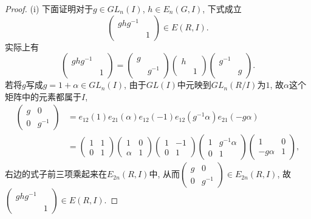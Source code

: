 \begin{proof}
	(i) 下面证明对于$g\in GL_n(I)$, $h\in E_n(G,I)$, 下式成立
	\[ \begin{pmatrix}
		ghg^{-1} & \\
			& 1
	\end{pmatrix} \in E(R,I).\]
	实际上有
	\[\begin{pmatrix}
		ghg^{-1} & \\
			& 1
	\end{pmatrix} = \begin{pmatrix}
		g & \\
			& g^{-1}
	\end{pmatrix}\begin{pmatrix}
		h & \\
			& 1
	\end{pmatrix}\begin{pmatrix}
		g^{-1} & \\
			& g
	\end{pmatrix}.\]
	若将$g$写成$g=1+\alpha \in GL_n(I)$, 由于$GL(I)$中元映到$GL_n(R/I)$为$1$, 故$\alpha$这个矩阵中的元素都属于$I$,
	\begin{align*}
	    \begin{pmatrix}
      g & 0 \\
      0 & g^{-1} 
    \end{pmatrix}
 &=e_{12}(1)e_{21}(\alpha)e_{12}(-1)e_{12}(g^{-1}\alpha)e_{21}(-g\alpha)\\
 &=\begin{pmatrix}
      1 & 1 \\
      0 & 1 
    \end{pmatrix}\begin{pmatrix}
      1 & 0 \\
      \alpha & 1
    \end{pmatrix}\begin{pmatrix}
      1 & -1 \\
      0 & 1
    \end{pmatrix}\begin{pmatrix}
      1 & g^{-1}\alpha \\
      0 & 1
    \end{pmatrix}\begin{pmatrix}
      1 & 0 \\
      -g\alpha & 1
    \end{pmatrix},
	\end{align*}
	右边的式子前三项乘起来在$E_{2n}(R,I)$中, 从而$\begin{pmatrix}
      g & 0 \\
      0 & g^{-1} 
    \end{pmatrix}\in E_{2n}(R,I)$, 故$\begin{pmatrix}
		ghg^{-1} & \\
			& 1
	\end{pmatrix} \in E(R,I)$.


\end{proof}
